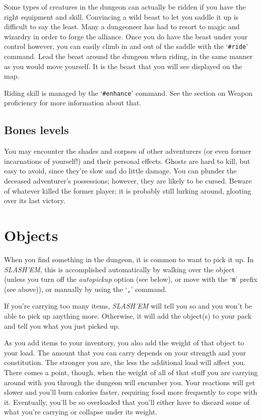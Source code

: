 
Some types of creatures in the dungeon can actually be ridden if you
have the right equipment and skill.  Convincing a wild beast to let
you saddle it up is difficult to say the least.  Many a dungeoneer 
has had to resort to magic and wizardry in order to forge the alliance.
Once you do have the beast under your control however, you can 
easily climb in and out of the saddle with the `{\tt \#ride}' command.  Lead
the beast around the dungeon when riding, in the same manner as 
you would move yourself.  It is the beast that you will see displayed
on the map.

Riding skill is managed by the `{\tt \#enhance}' command.  See the section
on Weapon proficiency for more information about that.
\subsection*{Bones levels}


You may encounter the shades and corpses of other adventurers (or even
former incarnations of yourself!) and their personal effects.  Ghosts
are hard to kill, but easy to avoid, since they're slow and do little
damage.  You can plunder the deceased adventurer's possessions;
however, they are likely to be cursed.  Beware of whatever killed the
former player; it is probably still lurking around, gloating over its
last victory.

\section{Objects }


When you find something in the dungeon, it is common to want to pick
it up.  In {\it SLASH'EM}, this is accomplished automatically by walking over
the object (unless you turn off the
{\it autopickup\/} 
option (see below), or move with the `{\tt m}' prefix (see above)), or
manually by using the `{\tt ,}' command.

If you're carrying too many items, {\it SLASH'EM\/} will tell you so and you won't 
be able to pick
up anything more.  Otherwise, it will add the object(s) to your pack and tell
you what you just picked up.

As you add items to your inventory, you also add the weight of that object
to your load.  The amount that you can carry depends on your strength and
your constitution.  The
stronger you are, the less the additional load will affect you.  There comes
a point, though, when the weight of all of that stuff you are carrying around
with you through the dungeon will encumber you.  Your reactions
will get slower and you'll burn calories faster, requiring food more frequently
to cope with it.  Eventually, you'll be so overloaded that you'll either have
to discard some of what you're carrying or collapse under its weight.

